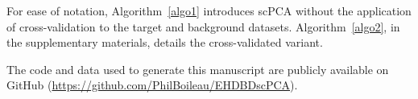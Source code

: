 For ease of notation, Algorithm~\ref{algo1} introduces scPCA without the application of cross-validation to the target and background datasets. Algorithm~\ref{algo2},
in the supplementary materials, details the cross-validated variant.

The code and data used to generate this manuscript are publicly available on
GitHub (\url{https://github.com/PhilBoileau/EHDBDscPCA}).
\FloatBarrier